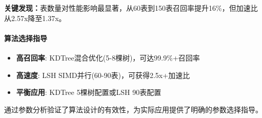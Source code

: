 \textbf{关键发现：}表数量对性能影响最显著，从60表到150表召回率提升16\%，但加速比从2.57x降至1.37x。

\paragraph{算法选择指导}

\begin{itemize}
    \item \textbf{高召回率}: KDTree混合优化(5-8棵树)，可达99.9\%+召回率
    \item \textbf{高速度}: LSH SIMD并行(60-90表)，可获得2.5x+加速比
    \item \textbf{平衡应用}: KDTree 5棵树配置或LSH 90表配置
\end{itemize}

通过参数分析验证了算法设计的有效性，为实际应用提供了明确的参数选择指导。 